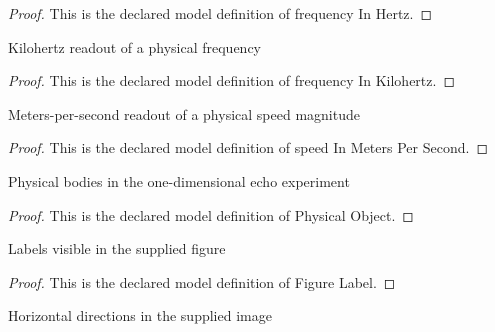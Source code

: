 \begin{proof}
  This is the declared model definition of frequency In Hertz.
\end{proof}
\begin{definition}
  \label{def:physics:phyx-mini-0327:phyxminiproblems-problemphyxmini0327-frequencyinkilohertz}
  Kilohertz readout of a physical frequency
\end{definition}
\begin{proof}
  This is the declared model definition of frequency In Kilohertz.
\end{proof}
\begin{definition}
  \label{def:physics:phyx-mini-0327:phyxminiproblems-problemphyxmini0327-speedinmeterspersecond}
  Meters-per-second readout of a physical speed magnitude
\end{definition}
\begin{proof}
  This is the declared model definition of speed In Meters Per Second.
\end{proof}
\begin{definition}
  \label{def:physics:phyx-mini-0327:phyxminiproblems-problemphyxmini0327-physicalobject}
  Physical bodies in the one-dimensional echo experiment
\end{definition}
\begin{proof}
  This is the declared model definition of Physical Object.
\end{proof}
\begin{definition}
  \label{def:physics:phyx-mini-0327:phyxminiproblems-problemphyxmini0327-figurelabel}
  Labels visible in the supplied figure
\end{definition}
\begin{proof}
  This is the declared model definition of Figure Label.
\end{proof}
\begin{definition}
  \label{def:physics:phyx-mini-0327:phyxminiproblems-problemphyxmini0327-horizontaldirection}
  Horizontal directions in the supplied image
\end{definition}
